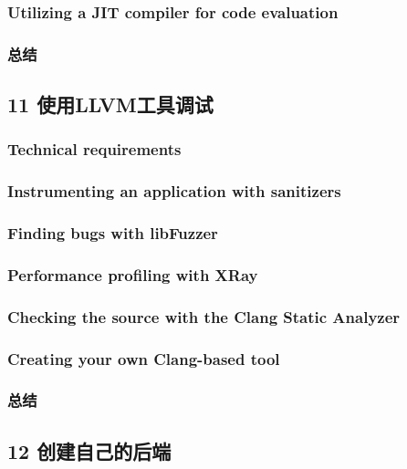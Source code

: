 \documentclass[11pt,a4paper,UTF8]{ctexart}
\begin{document}
		\subsubsection{Utilizing a JIT compiler for code evaluation}
		\subsubsection{总结}
	\subsection{11 使用LLVM工具调试}
		\subsubsection{Technical requirements}
		\subsubsection{Instrumenting an application with sanitizers}
		\subsubsection{Finding bugs with libFuzzer}
		\subsubsection{Performance profiling with XRay}
		\subsubsection{Checking the source with the Clang Static Analyzer}
		\subsubsection{Creating your own Clang-based tool}
		\subsubsection{总结}
	\subsection{12 创建自己的后端}
\end{document}
